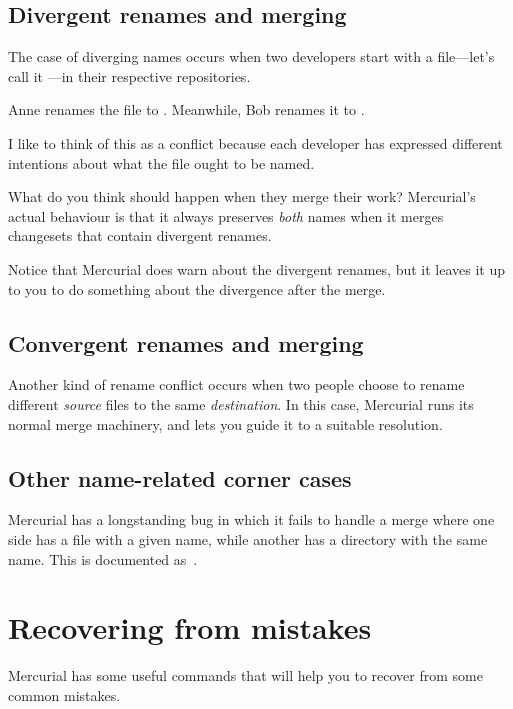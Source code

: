 \subsection{Divergent renames and merging}

The case of diverging names occurs when two developers start with a
file---let's call it ---in their respective
repositories.

Anne renames the file to .
Meanwhile, Bob renames it to .

I like to think of this as a conflict because each developer has
expressed different intentions about what the file ought to be named.

What do you think should happen when they merge their work?
Mercurial's actual behaviour is that it always preserves \emph{both}
names when it merges changesets that contain divergent renames.

Notice that Mercurial does warn about the divergent renames, but it
leaves it up to you to do something about the divergence after the merge.

\subsection{Convergent renames and merging}

Another kind of rename conflict occurs when two people choose to
rename different \emph{source} files to the same \emph{destination}.
In this case, Mercurial runs its normal merge machinery, and lets you
guide it to a suitable resolution.

\subsection{Other name-related corner cases}

Mercurial has a longstanding bug in which it fails to handle a merge
where one side has a file with a given name, while another has a
directory with the same name.  This is documented as~.

\section{Recovering from mistakes}

Mercurial has some useful commands that will help you to recover from
some common mistakes.

